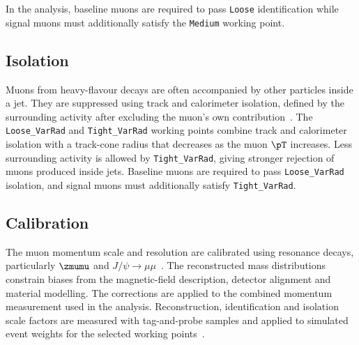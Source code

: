 In the analysis, baseline muons are required to pass \texttt{Loose} identification while signal muons must additionally satisfy the \texttt{Medium} working point.

\subsection{Isolation}

Muons from heavy-flavour decays are often accompanied by other particles inside a jet.
They are suppressed using track and calorimeter isolation, defined by the surrounding activity after excluding the muon's own contribution~\cite{ATLAS2021MuonID}.
The \texttt{Loose\_VarRad} and \texttt{Tight\_VarRad} working points combine track and calorimeter isolation with a track-cone radius that decreases as the muon $\pT$ increases.
Less surrounding activity is allowed by \texttt{Tight\_VarRad}, giving stronger rejection of muons produced inside jets.
Baseline muons are required to pass \texttt{Loose\_VarRad} isolation, and signal muons must additionally satisfy \texttt{Tight\_VarRad}.

\subsection{Calibration}

The muon momentum scale and resolution are calibrated using resonance decays, particularly $\zmumu$ and $J/\psi\rightarrow\mu\mu$~\cite{ATLAS2023MuonCalibration}.
The reconstructed mass distributions constrain biases from the magnetic-field description, detector alignment and material modelling.
The corrections are applied to the combined momentum measurement used in the analysis.
Reconstruction, identification and isolation scale factors are measured with tag-and-probe samples and applied to simulated event weights for the selected working points~\cite{ATLAS2021MuonID}.
